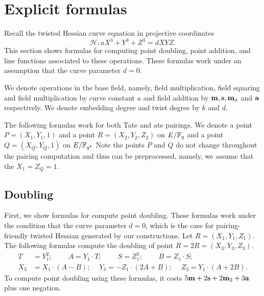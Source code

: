 \section{Explicit formulas}
\label{sec:formulas}

Recall the twisted Hessian curve equation in projective coordinates
$$ \mathcal{H}: a X^3 + Y^3 + Z^3 = d X Y Z. $$
This section shows formulas for computing point doubling, point addition,
and line functions associated to these operations.
These formulas work under an assumption that the curve parameter $d = 0$.

We denote operations in the base field, namely, 
field multiplication, field squaring and field multiplication by curve constant $a$ and field addition
by $\textbf{m}, \textbf{s}, \textbf{m}_{a}$ and $\textbf{a}$ respectively.
We denote embedding degree and twist degree by $k$ and $d$.

The following formulas work for both Tate and ate pairings.
We denote a point $P = (X_1,Y_1,1)$ and a point $R = (X_2,Y_2,Z_2)$ on $E/\mathbb{F}_{q}$
and a point $Q = (X_Q,Y_Q,1)$ on $E/\mathbb{F}_{q^{k}}$
Note the points $P$ and $Q$ do not change throughout the pairing computation and thus can be preprocessed,
namely, we assume that the $X_1 = Z_Q = 1$.



\subsection{Doubling}
First, we show formulas for compute point doubling.
These formulas work under the condition that the curve parameter $d=0$,
which is the case for pairing-friendly twisted Hessian generated by our constructions.
Let $R = (X_1, Y_1, Z_1)$.
The following formulas compute the doubling of point $R = 2R = (X_3,Y_3,Z_3)$.
\begin{align*}
T &= Y_1^2;\	\qquad	A = Y_1 \cdot T;\	\qquad
S = Z_1 ^ 2;\	\qquad	B = Z_1 \cdot S;\\
X_3 &= X_1 \cdot (A - B);\	\quad
Y_3 = -Z_1 \cdot (2A + B);\	\quad
Z_3 = Y_1 \cdot (A + 2B).
\end{align*}
To compute point doubling using these formulas,
it costs $5\textbf{m} + 2\textbf{s} + 2\textbf{m}_{2} + 3\textbf{a}$ plus one negation.

